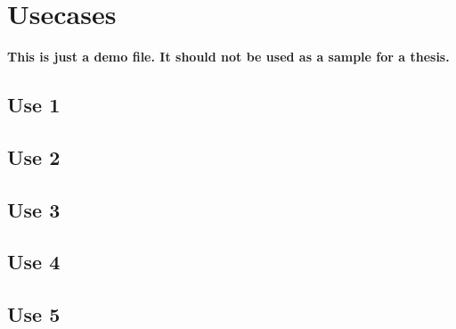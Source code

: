 \chapter{Usecases}
\label{chapter:usecases}

\textbf{This is just a demo file. It should not be used as a sample for a thesis.}\\

\section{Use 1}
\label{sec:use1}

\section{Use 2}
\label{sec:use2}

\section{Use 3}
\label{sec:use3}

\section{Use 4}
\label{sec:use4}

\section{Use 5}
\label{sec:use5}


